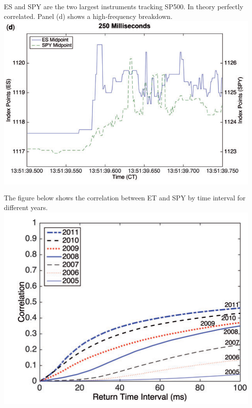 \documentclass[english,10pt
,aspectratio=169
]{beamer}
\begin{document}
\begin{frame}[noframenumbering]{\citet*{budish_high-frequency_2015}}
	ES and SPY are the two largest instruments tracking SP500. In theory perfectly correlated. Panel (d) shows a high-frequency breakdown.
	\center
	\includegraphics[scale=0.7]{pics/HTF_Corr_4}
\end{frame}


\begin{frame}[noframenumbering]{\citet*{budish_high-frequency_2015}}
	The figure below shows the correlation between ET and SPY by time interval for different years.
	\center
	\includegraphics[scale=0.7]{pics/HTF_Corr_Time}
\end{frame}
\end{document}
